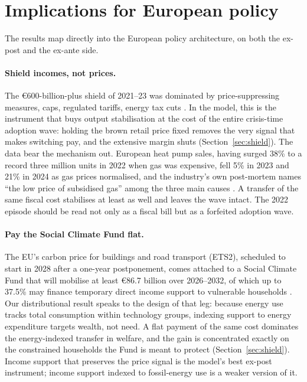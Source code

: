\section{Implications for European policy}
\label{sec:policy}

The results map directly into the European policy architecture, on both the
ex-post and the ex-ante side.

\paragraph{Shield incomes, not prices.} The \euro{600}-billion-plus shield of
2021--23 was dominated by price-suppressing measures, caps, regulated tariffs,
energy tax cuts \citep{Bruegel2023}. In the model, this is the instrument that
buys output stabilisation at the cost of the entire crisis-time adoption wave:
holding the brown retail price fixed removes the very signal that makes
switching pay, and the extensive margin shuts (Section~\ref{sec:shield}). The
data bear the mechanism out. European heat pump sales, having surged 38\% to a
record three million units in 2022 when gas was expensive, fell 5\% in 2023 and
21\% in 2024 as gas prices normalised, and the industry's own post-mortem
names ``the low price of subsidised gas'' among the three main causes
\citep{EHPA2024,EHPA2025}. A transfer of the same fiscal cost stabilises at
least as well and leaves the wave intact. The 2022 episode should be read not
only as a fiscal bill but as a forfeited adoption wave.

\paragraph{Pay the Social Climate Fund flat.} The EU's carbon price for
buildings and road transport (ETS2), scheduled to start in 2028 after a
one-year postponement, comes attached to a Social Climate Fund that will
mobilise at least \euro{86.7} billion over 2026--2032, of which up to 37.5\%
may finance temporary direct income support to vulnerable households
\citep{ECETS2}. Our distributional result speaks to the design of that leg:
because energy use tracks total consumption within technology groups, indexing
support to energy expenditure targets wealth, not need. A flat payment of the
same cost dominates the energy-indexed transfer in welfare, and the gain is
concentrated exactly on the constrained households the Fund is meant to
protect (Section~\ref{sec:shield}). Income support that preserves the price
signal is the model's best ex-post instrument; income support indexed to
fossil-energy use is a weaker version of it.

